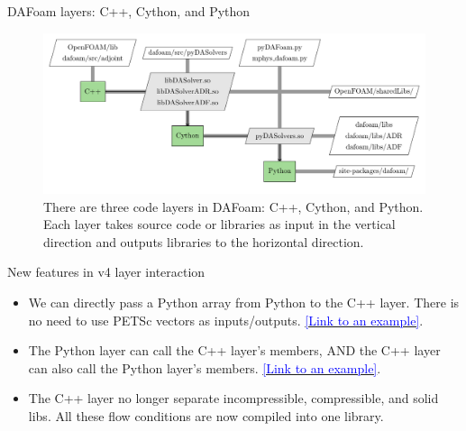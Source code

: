\documentclass{bredelebeamer}
\begin{document}
\begin{frame}{DAFoam layers: C++, Cython, and Python}

\begin{figure}
\hspace*{-1.1cm}
\includegraphics[width=1.18\linewidth]{images/dafoam_layers.pdf} 
\caption{There are three code layers in DAFoam: C++, Cython, and Python. Each layer takes source code or libraries as input in the vertical direction and outputs libraries to the horizontal direction.}
\end{figure}

\end{frame}


\begin{frame}[fragile]{New features in v4 layer interaction}


\begin{itemize}
  \setlength\itemsep{0.5em}
 \item We can directly pass a Python array from Python to the C++ layer. There is no need to use PETSc vectors as inputs/outputs. \href{https://github.com/mdolab/dafoam/blob/v4.0.2/src/pyDASolvers/pyDASolvers.pyx#L253}{\textcolor{blue}{[Link to an example]}}.
 \item The Python layer can call the C++ layer's members, AND the C++ layer can also call the Python layer's members. 
 \href{https://github.com/mdolab/dafoam/blob/v4.0.2/src/adjoint/DARegression/DARegression.C#L512}{\textcolor{blue}{[Link to an example]}}.
 \item The C++ layer no longer separate incompressible, compressible, and solid libs. All these flow conditions are now compiled into one library.
\end{itemize}
  
\end{frame}
\end{document}
